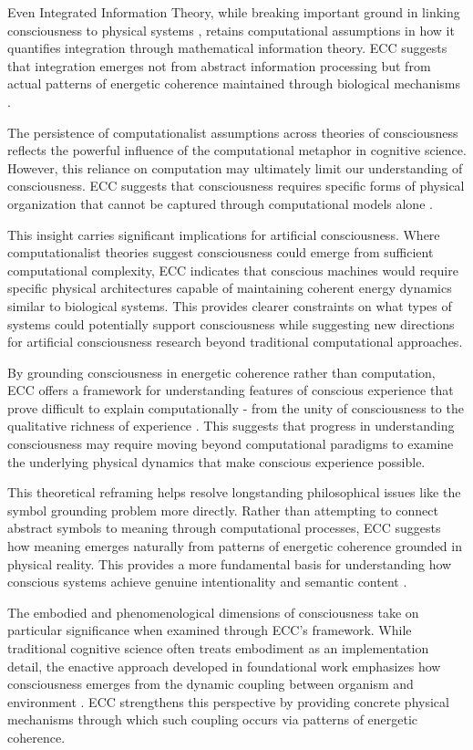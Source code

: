 \begin{refsection}
Even Integrated Information Theory, while breaking important ground in linking consciousness to physical systems \cite{Koch2018}, retains computational assumptions in how it quantifies integration through mathematical information theory. ECC suggests that integration emerges not from abstract information processing but from actual patterns of energetic coherence maintained through biological mechanisms \cite{Tononi2021}.

The persistence of computationalist assumptions across theories of consciousness reflects the powerful influence of the computational metaphor in cognitive science. However, this reliance on computation may ultimately limit our understanding of consciousness. ECC suggests that consciousness requires specific forms of physical organization that cannot be captured through computational models alone \cite{Dehaene2021}.

This insight carries significant implications for artificial consciousness. Where computationalist theories suggest consciousness could emerge from sufficient computational complexity, ECC indicates that conscious machines would require specific physical architectures capable of maintaining coherent energy dynamics similar to biological systems. This provides clearer constraints on what types of systems could potentially support consciousness while suggesting new directions for artificial consciousness research beyond traditional computational approaches.

By grounding consciousness in energetic coherence rather than computation, ECC offers a framework for understanding features of conscious experience that prove difficult to explain computationally - from the unity of consciousness to the qualitative richness of experience \cite{Lamme2020}. This suggests that progress in understanding consciousness may require moving beyond computational paradigms to examine the underlying physical dynamics that make conscious experience possible.

This theoretical reframing helps resolve longstanding philosophical issues like the symbol grounding problem more directly. Rather than attempting to connect abstract symbols to meaning through computational processes, ECC suggests how meaning emerges naturally from patterns of energetic coherence grounded in physical reality. This provides a more fundamental basis for understanding how conscious systems achieve genuine intentionality and semantic content \cite{Chalmers2018}.

The embodied and phenomenological dimensions of consciousness take on particular significance when examined through ECC's framework. While traditional cognitive science often treats embodiment as an implementation detail, the enactive approach developed in foundational work emphasizes how consciousness emerges from the dynamic coupling between organism and environment \cite{Varela2017}. ECC strengthens this perspective by providing concrete physical mechanisms through which such coupling occurs via patterns of energetic coherence.


\end{refsection}
